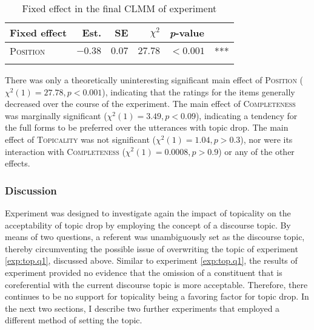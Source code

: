 \begin{table}
\caption{Fixed effect in the final CLMM of experiment }
\centering
\begin{tabular}{lrrrll}
\lsptoprule
Fixed effect & Est. & SE & $\chi^2$ & \textit{p}-value &   \\
\midrule
\textsc{Position} & $-0.38$ & $0.07$ & $27.78$ & $< 0.001$ & ***\\
\lspbottomrule
\end{tabular}
\label{tab:model.exp.top.q2}
\end{table}

\noindent
There was only a theoretically uninteresting significant main effect of \textsc{Position} ($\chi^2(1) = 27.78, p < 0.001$), indicating that the ratings for the items generally decreased over the course of the experiment.
The main effect of \textsc{Completeness} was marginally significant ($\chi^2(1) = 3.49, p < 0.09$), indicating a tendency for the full forms to be preferred over the utterances with topic drop.
The main effect of \textsc{Topicality} was not significant ($\chi^2(1) = 1.04, p > 0.3$), nor were its interaction with \textsc{Completeness} ($\chi^2(1) = 0.0008, p > 0.9$) or any of the other effects.

\subsubsection{Discussion}
Experiment  was designed to investigate again the impact of topicality on the acceptability of topic drop by employing the concept of a discourse topic. 
By means of two questions, a referent was unambiguously set as the discourse topic,  thereby circumventing the possible issue of overwriting the topic of experiment \ref*{exp:top.q1}, discussed above.
Similar to experiment \ref*{exp:top.q1}, the results of experiment  provided no evidence that the omission of a constituent that is coreferential with the current discourse topic  is more acceptable.
Therefore, there continues to be no support for topicality being a favoring factor for topic drop.
In the next two sections, I describe two further experiments that employed a different method of setting the topic. 

\label{exp:top.s.fv}

